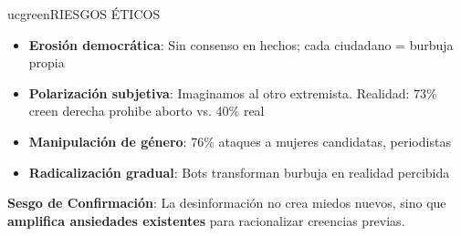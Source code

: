 \begin{sectionbox}{ucgreen}{RIESGOS ÉTICOS}

{\fontsize{20}{24}\selectfont
\begin{itemize}
    \setlength{\itemsep}{0.15cm}
    \item \textcolor{ucred}{\textbf{Erosión democrática}}: Sin consenso en hechos; cada ciudadano = burbuja propia
    \item \textcolor{ucred}{\textbf{Polarización subjetiva}}: Imaginamos al otro extremista. Realidad: 73\% creen derecha prohibe aborto vs. 40\% real
    \item \textcolor{ucred}{\textbf{Manipulación de género}}: 76\% ataques a mujeres candidatas, periodistas
    \item \textcolor{ucred}{\textbf{Radicalización gradual}}: Bots transforman burbuja en realidad percibida
\end{itemize}
}

\vspace{0.2cm}
{\fontsize{20}{24}\selectfont
\textbf{\textcolor{darktext}{Sesgo de Confirmación}}: La desinformación no crea miedos nuevos, sino que \textbf{amplifica ansiedades existentes} para racionalizar creencias previas.
}

\end{sectionbox}